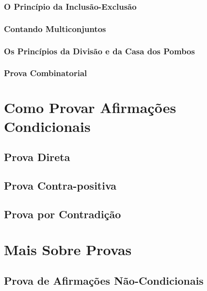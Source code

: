 \documentclass[a4paper,11pt]{book}
\theoremstyle{definition}
\theoremstyle{break}
\begin{document}
\section{O Princípio da Inclusão-Exclusão}
\section{Contando Multiconjuntos}
\section{Os Princípios da Divisão e da Casa dos Pombos}
\section{Prova Combinatorial}

\part{Como Provar Afirmações Condicionais}

\chapter{Prova Direta}

\chapter{Prova Contra-positiva}

\chapter{Prova por Contradição}


\part{Mais Sobre Provas}

\chapter{Prova de Afirmações Não-Condicionais}
\end{document}
